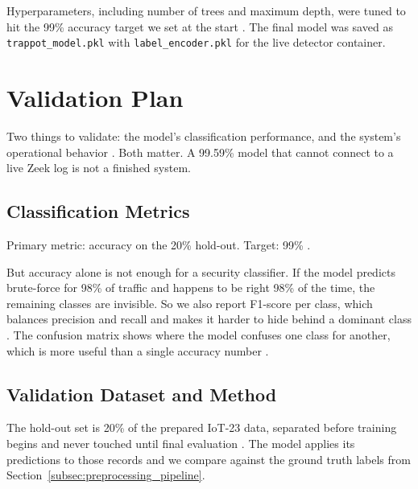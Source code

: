 Hyperparameters, including number of trees and maximum depth, were tuned to hit the 99\% accuracy target we set at the start \cite{pan2024xgboost,optimized2024arxiv}. The final model was saved as \texttt{trappot\_model.pkl} with \texttt{label\_encoder.pkl} for the live detector container.

\section{Validation Plan}
\label{sec:validation_plan}

Two things to validate: the model's classification performance, and the system's operational behavior \cite{confusion2023pmc,mary2024network}. Both matter. A 99.59\% model that cannot connect to a live Zeek log is not a finished system.

\subsection{Classification Metrics}
\label{subsec:performance_metrics}

Primary metric: accuracy on the 20\% hold-out. Target: 99\% \cite{karim2024efficient,mary2024network,lee2021classification}.

But accuracy alone is not enough for a security classifier. If the model predicts brute-force for 98\% of traffic and happens to be right 98\% of the time, the remaining classes are invisible. So we also report F1-score per class, which balances precision and recall and makes it harder to hide behind a dominant class \cite{confusion2023pmc,karim2024efficient}. The confusion matrix shows where the model confuses one class for another, which is more useful than a single accuracy number \cite{confusion2023pmc,mary2024network,lee2021classification,9213728}.

\subsection{Validation Dataset and Method}
\label{subsec:validation_dataset}

The hold-out set is 20\% of the prepared IoT-23 data, separated before training begins and never touched until final evaluation \cite{optimized2024arxiv,karim2024efficient}. The model applies its predictions to those records and we compare against the ground truth labels from Section~\ref{subsec:preprocessing_pipeline}.

